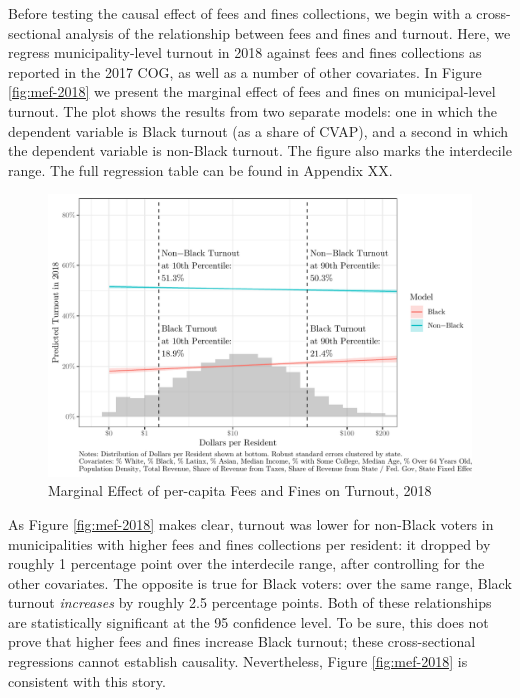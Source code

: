 \documentclass[
  12pt,
]{article}
\begin{document}
Before testing the causal effect of fees and fines collections, we begin with a cross-sectional analysis of the relationship between fees and fines and turnout. Here, we regress municipality-level turnout in 2018 against fees and fines collections as reported in the 2017 COG, as well as a number of other covariates. In Figure \ref{fig:mef-2018} we present the marginal effect of fees and fines on municipal-level turnout. The plot shows the results from two separate models: one in which the dependent variable is Black turnout (as a share of CVAP), and a second in which the dependent variable is non-Black turnout. The figure also marks the interdecile range. The full regression table can be found in Appendix XX.

\begin{figure}[H]

{\centering \includegraphics{draft_paper_files/figure-latex/cross-18-1} 

}

\caption{\label{fig:mef-2018}Marginal Effect of per-capita Fees and Fines on Turnout, 2018}\label{fig:cross-18}
\end{figure}

As Figure \ref{fig:mef-2018} makes clear, turnout was lower for non-Black voters in municipalities with higher fees and fines collections per resident: it dropped by roughly 1 percentage point over the interdecile range, after controlling for the other covariates. The opposite is true for Black voters: over the same range, Black turnout \emph{increases} by roughly 2.5 percentage points. Both of these relationships are statistically significant at the 95 confidence level. To be sure, this does not prove that higher fees and fines increase Black turnout; these cross-sectional regressions cannot establish causality. Nevertheless, Figure \ref{fig:mef-2018} is consistent with this story.
\end{document}
